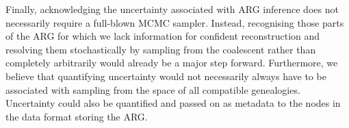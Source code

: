 \documentclass{article}
\newcommand{\tsinfer}[0]{\texttt{tsinfer}}
\newcommand{\kwarg}[0]{\texttt{KwARG}}
\newcommand{\argneedle}[0]{\texttt{ARG-Needle}}
\newcommand{\argweaver}[0]{\texttt{ARGweaver}}
\newcommand{\relate}[0]{\texttt{Relate}}
\begin{document}
Finally, acknowledging the uncertainty associated with ARG inference does not
necessarily require a full-blown MCMC sampler. Instead, recognising those parts of
the ARG for which we lack information for confident reconstruction and resolving
them stochastically by sampling from the coalescent rather than completely arbitrarily
would already be a major step forward. 
Furthermore, we believe that quantifying uncertainty
would not necessarily always have to be associated with sampling from the space of all
compatible genealogies. Uncertainty could also
be quantified and passed on as metadata to the nodes in the data format storing the ARG.





\end{document}
